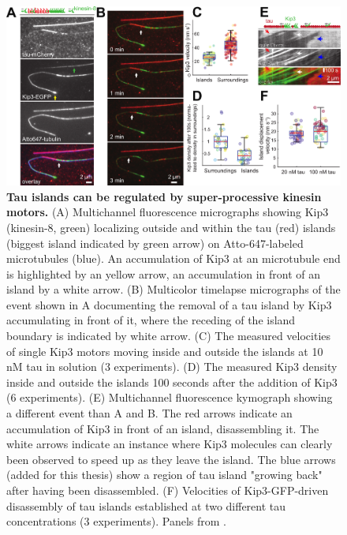 \begin{figure}[h!]
\centering
\includegraphics[width=1\linewidth]{Figures/taukip3.png}
\caption[Tau islands can be regulated by super-processive kinesin motors.]{
\textbf{Tau islands can be regulated by super-processive kinesin motors.} (A) Multichannel fluorescence micrographs showing Kip3 (kinesin-8, green) localizing outside and within the tau (red) islands (biggest island indicated by green arrow) on Atto-647-labeled microtubules (blue). An accumulation of Kip3 at an microtubule end is highlighted by an yellow arrow, an accumulation in front of an island by a white arrow. (B) Multicolor timelapse micrographs of the event shown in A documenting the removal of a tau island by Kip3 accumulating in front of it, where the receding of the island boundary is indicated by white arrow. (C) The measured velocities of single Kip3 motors moving inside and outside the islands at 10 nM tau in solution (3 experiments). (D) The measured Kip3 density inside and outside the islands 100 seconds after the addition of Kip3 (6 experiments). (E) Multichannel fluorescence kymograph showing a different event than A and B. The red arrows indicate an accumulation of Kip3 in front of an island, disassembling it. The white arrows indicate an instance where Kip3 molecules can clearly been observed to speed up as they leave the island. The blue arrows (added for this thesis) show a region of tau island "growing back" after having been disassembled. (F) Velocities of Kip3-GFP-driven disassembly of tau islands established at two different tau concentrations (3 experiments). Panels from \cite{Siahaan2019a}.
	}\label{taukip3}
\end{figure}

